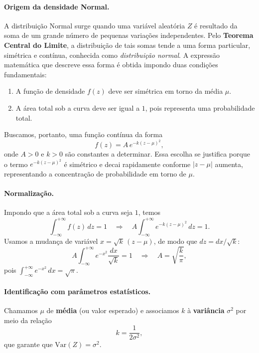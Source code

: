 
\paragraph{Origem da densidade Normal.}

A distribuição Normal surge quando uma variável aleatória $Z$ é resultado da soma de um grande número de pequenas variações independentes. 
Pelo \textbf{Teorema Central do Limite}, a distribuição de tais somas tende a uma forma particular, simétrica e contínua, conhecida como \textit{distribuição normal}. 
A expressão matemática que descreve essa forma é obtida impondo duas condições fundamentais:

\begin{enumerate}
    \item A função de densidade $f(z)$ deve ser simétrica em torno da média $\mu$.
    \item A área total sob a curva deve ser igual a $1$, pois representa uma probabilidade total.
\end{enumerate}

Buscamos, portanto, uma função contínua da forma
\[
f(z) = A \, e^{-k(z-\mu)^2},
\]
onde $A>0$ e $k>0$ são constantes a determinar.  
Essa escolha se justifica porque o termo $e^{-k(z-\mu)^2}$ é simétrico e decai rapidamente conforme $|z-\mu|$ aumenta, 
representando a concentração de probabilidade em torno de $\mu$.

\paragraph{Normalização.}
Impondo que a área total sob a curva seja $1$, temos
\[
\int_{-\infty}^{+\infty} f(z)\,dz = 1 
\quad \Longrightarrow \quad 
A \int_{-\infty}^{+\infty} e^{-k(z-\mu)^2}\,dz = 1.
\]
Usamos a mudança de variável $x = \sqrt{k}\,(z-\mu)$, de modo que $dz = dx/\sqrt{k}$:
\[
A \int_{-\infty}^{+\infty} e^{-x^2}\frac{dx}{\sqrt{k}} = 1
\quad \Longrightarrow \quad
A = \sqrt{\frac{k}{\pi}},
\]
pois $\displaystyle \int_{-\infty}^{+\infty} e^{-x^2}\,dx = \sqrt{\pi}$.

\paragraph{Identificação com parâmetros estatísticos.}
Chamamos $\mu$ de \textbf{média} (ou valor esperado) e associamos $k$ à \textbf{variância} $\sigma^2$ por meio da relação
\[
k = \frac{1}{2\sigma^2},
\]
que garante que $\mathrm{Var}(Z)=\sigma^2$.

